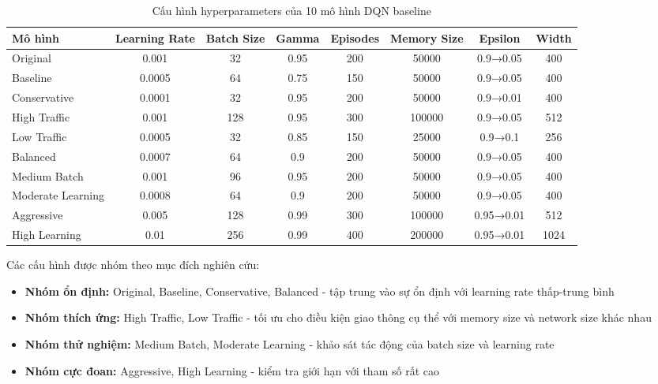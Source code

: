 \begin{table}[!htp]
\centering
\caption{Cấu hình hyperparameters của 10 mô hình DQN baseline}
\label{tab:base_model_configs}
\begin{tabular}{|l|c|c|c|c|c|c|c|}
\hline
\textbf{Mô hình} & \textbf{Learning Rate} & \textbf{Batch Size} & \textbf{Gamma} & \textbf{Episodes} & \textbf{Memory Size} & \textbf{Epsilon} & \textbf{Width} \\
\hline
Original & 0.001 & 32 & 0.95 & 200 & 50000 & 0.9→0.05 & 400 \\
\hline
Baseline & 0.0005 & 64 & 0.75 & 150 & 50000 & 0.9→0.05 & 400 \\
\hline
Conservative & 0.0001 & 32 & 0.95 & 200 & 50000 & 0.9→0.01 & 400 \\
\hline
High Traffic & 0.001 & 128 & 0.95 & 300 & 100000 & 0.9→0.05 & 512 \\
\hline
Low Traffic & 0.0005 & 32 & 0.85 & 150 & 25000 & 0.9→0.1 & 256 \\
\hline
Balanced & 0.0007 & 64 & 0.9 & 200 & 50000 & 0.9→0.05 & 400 \\
\hline
Medium Batch & 0.001 & 96 & 0.95 & 200 & 50000 & 0.9→0.05 & 400 \\
\hline
Moderate Learning & 0.0008 & 64 & 0.9 & 200 & 50000 & 0.9→0.05 & 400 \\
\hline
Aggressive & 0.005 & 128 & 0.99 & 300 & 100000 & 0.95→0.01 & 512 \\
\hline
High Learning & 0.01 & 256 & 0.99 & 400 & 200000 & 0.95→0.01 & 1024 \\
\hline
\end{tabular}
\end{table}

Các cấu hình được nhóm theo mục đích nghiên cứu:
\begin{itemize}
    \item \textbf{Nhóm ổn định:} Original, Baseline, Conservative, Balanced - tập trung vào sự ổn định với learning rate thấp-trung bình
    \item \textbf{Nhóm thích ứng:} High Traffic, Low Traffic - tối ưu cho điều kiện giao thông cụ thể với memory size và network size khác nhau
    \item \textbf{Nhóm thử nghiệm:} Medium Batch, Moderate Learning - khảo sát tác động của batch size và learning rate
    \item \textbf{Nhóm cực đoan:} Aggressive, High Learning - kiểm tra giới hạn với tham số rất cao
\end{itemize}

